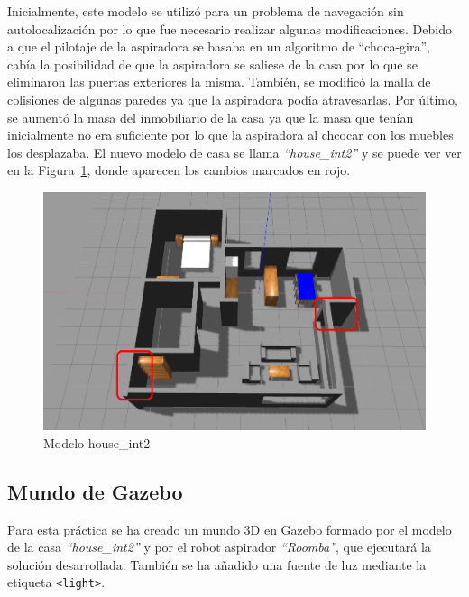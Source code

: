 Inicialmente, este modelo se utilizó para un problema de navegación sin autolocalización por lo que fue necesario realizar algunas modificaciones. Debido a que el pilotaje de la aspiradora se basaba en un algoritmo de ``choca-gira'', cabía la posibilidad de que la aspiradora se saliese de la casa por lo que se eliminaron las puertas exteriores la misma. También, se modificó la malla de colisiones de algunas paredes ya que la aspiradora podía atravesarlas. Por último, se aumentó la masa del inmobiliario de la casa ya que la masa que tenían inicialmente no era suficiente por lo que la aspiradora al chcocar con los muebles los desplazaba. El nuevo modelo de casa se llama \textit{``house\_int2''} y se puede ver ver en la Figura~\ref{fig.house_int2}, donde aparecen los cambios marcados en rojo.\\


\begin{figure}[H]
  \begin{center}
    \includegraphics[width=1.0\textwidth]{figures/Vacuum/house_int2.png}
		\caption{Modelo house\_int2}
		\label{fig.house_int2}
		\end{center}
\end{figure}



\subsection{Mundo de Gazebo}
Para esta práctica se ha creado un mundo 3D en Gazebo formado por el modelo de la casa \textit{``house\_int2''} y por el robot aspirador \textit{``Roomba''}, que ejecutará la solución desarrollada. También se ha añadido una fuente de luz mediante la etiqueta \texttt{<light>}.\\

